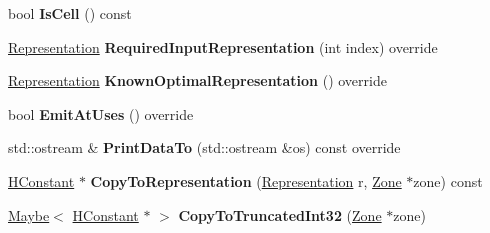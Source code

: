 \begin{DoxyCompactItemize}
\item 
bool {\bfseries Is\+Cell} () const \hypertarget{classv8_1_1internal_1_1_h_constant_a7633850f0661ee372e16040653185485}{}\label{classv8_1_1internal_1_1_h_constant_a7633850f0661ee372e16040653185485}

\item 
\hyperlink{classv8_1_1internal_1_1_representation}{Representation} {\bfseries Required\+Input\+Representation} (int index) override\hypertarget{classv8_1_1internal_1_1_h_constant_aed418988d6c04f3e2f04d83f90615f18}{}\label{classv8_1_1internal_1_1_h_constant_aed418988d6c04f3e2f04d83f90615f18}

\item 
\hyperlink{classv8_1_1internal_1_1_representation}{Representation} {\bfseries Known\+Optimal\+Representation} () override\hypertarget{classv8_1_1internal_1_1_h_constant_a67d69c7255702f2b3c99c2c4229b2195}{}\label{classv8_1_1internal_1_1_h_constant_a67d69c7255702f2b3c99c2c4229b2195}

\item 
bool {\bfseries Emit\+At\+Uses} () override\hypertarget{classv8_1_1internal_1_1_h_constant_add7d5b7774805a0443960dc0cc04070b}{}\label{classv8_1_1internal_1_1_h_constant_add7d5b7774805a0443960dc0cc04070b}

\item 
std\+::ostream \& {\bfseries Print\+Data\+To} (std\+::ostream \&os) const  override\hypertarget{classv8_1_1internal_1_1_h_constant_a734ffdb2f87a40a7374b970877de9283}{}\label{classv8_1_1internal_1_1_h_constant_a734ffdb2f87a40a7374b970877de9283}

\item 
\hyperlink{classv8_1_1internal_1_1_h_constant}{H\+Constant} $\ast$ {\bfseries Copy\+To\+Representation} (\hyperlink{classv8_1_1internal_1_1_representation}{Representation} r, \hyperlink{classv8_1_1internal_1_1_zone}{Zone} $\ast$zone) const \hypertarget{classv8_1_1internal_1_1_h_constant_ae8664e3d34e989ae83ec7730d4ce4c60}{}\label{classv8_1_1internal_1_1_h_constant_ae8664e3d34e989ae83ec7730d4ce4c60}

\item 
\hyperlink{classv8_1_1_maybe}{Maybe}$<$ \hyperlink{classv8_1_1internal_1_1_h_constant}{H\+Constant} $\ast$ $>$ {\bfseries Copy\+To\+Truncated\+Int32} (\hyperlink{classv8_1_1internal_1_1_zone}{Zone} $\ast$zone)\hypertarget{classv8_1_1internal_1_1_h_constant_a7de009857a7ed791a09ec52134572a14}{}\label{classv8_1_1internal_1_1_h_constant_a7de009857a7ed791a09ec52134572a14}


\end{DoxyCompactItemize}
